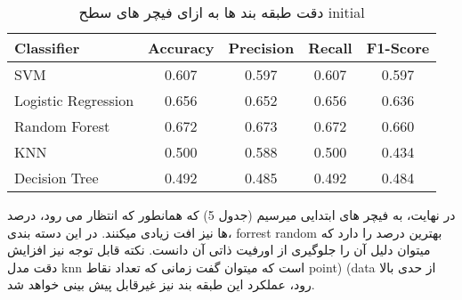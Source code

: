 \documentclass[a4paper,12pt]{article}
\begin{document}
\begin{table}[h]
	\centering
	\begin{latin}
	\begin{tabular}{|l|c|c|c|c|}
		\hline
		\textbf{Classifier} & \textbf{Accuracy} & \textbf{Precision} & \textbf{Recall} & \textbf{F1-Score} \\
		\hline
		SVM & 0.607 & 0.597 & 0.607 & 0.597 \\
		\hline
		Logistic Regression & 0.656 & 0.652 & 0.656 & 0.636 \\
		\hline
		Random Forest & 0.672 & 0.673 & 0.672 & 0.660 \\
		\hline
		KNN & 0.500 & 0.588 & 0.500 & 0.434 \\
		\hline
		Decision Tree & 0.492 & 0.485 & 0.492 & 0.484 \\
		\hline
	\end{tabular}
	\end{latin}
	\caption{دقت طبقه بند ها به ازای فیچر های سطح initial}
	\label{tab:classifier_performance_3}
\end{table}

در نهایت، به فیچر های ابتدایی میرسیم (جدول 5) که همانطور که انتظار می رود، درصد ها نیز افت زیادی میکنند. در این دسته بندی، forrest random بهترین درصد را دارد که میتوان دلیل آن را جلوگیری از اورفیت ذاتی آن دانست. نکته قابل توجه نیز افزایش دقت مدل knn است که میتوان گفت زمانی که تعداد نقاط point) (data از حدی بالا رود، عملکرد این طبقه بند نیز غیرقابل پیش بینی خواهد شد. 

\end{document}
